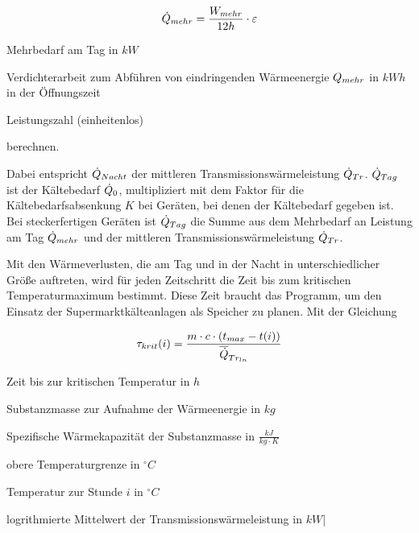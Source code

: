 \begin{equation}
	\pmehr = \frac{\lmehr}{12h} \cdot \epsilon
\label{<++>}
\end{equation}

\begin{description}[\dth]

	\item[$\pmehr$] Mehrbedarf am Tag in $kW$
	\item[$\lmehr$] Verdichterarbeit zum Abführen von eindringenden
		Wärmeenergie $Q_{mehr}$ in $kWh$ in der \"Offnungszeit
	\item[$\epsilon$] Leistungszahl (einheitenlos)

\end{description}
\vspace{0.5cm}
berechnen.

Dabei entspricht $\dot{Q}_{Nacht}$ der mittleren Transmissionswärmeleistung $\dot{Q}_{Tr}$.
$\dot{Q}_{Tag}$ ist der Kältebedarf $\dot{Q}_{0}$, multipliziert mit dem Faktor für die
Kältebedarfsabsenkung $K$ bei Geräten, bei denen der Kältebedarf gegeben ist.
Bei steckerfertigen Geräten ist $\dot{Q}_{Tag}$ die Summe aus dem Mehrbedarf an Leistung
am Tag $\pmehr$ und der mittleren Transmissionswärmeleistung $\dot{Q}_{Tr}$.

Mit den Wärmeverlusten, die am Tag und in der Nacht in unterschiedlicher Größe
auftreten, wird für jeden Zeitschritt die Zeit bis zum kritischen
Temperaturmaximum bestimmt. Diese Zeit braucht das Programm, um den Einsatz der
Supermarktkälteanlagen als Speicher zu planen. Mit der Gleichung

\begin{equation}
	\tau_{krit}(i) = \frac{m \cdot c \cdot (t_{max} -
		t(i))}{\aptranslog}
\label{taukn}
\end{equation}

\begin{description}[\dth]

	\item[$\tau_{krit}$] Zeit bis zur kritischen Temperatur in $h$
	\item[$m$] Substanzmasse zur Aufnahme der Wärmeenergie in $kg$
	\item[$c$] Spezifische Wärmekapazität der Substanzmasse in $\frac{kJ}{kg
		\cdot K}$
	\item[$t_{max}$] obere Temperaturgrenze in $ ^{\circ} C $
	\item[$t(i)$] Temperatur zur Stunde $i$ in $ ^{\circ} C $
	\item[$\aptranslog$] logrithmierte Mittelwert der
		Transmissionswärmeleistung in $kW$|
\end{description}
\vspace{0.5cm}


